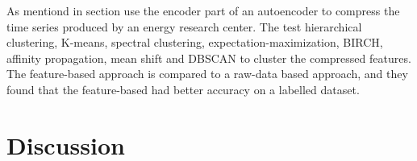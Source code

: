 As mentiond in section \textcite{auto_encoder_many_tsc_algorithms} use the encoder part of an autoencoder to compress the time series produced by an energy research center. 
The test hierarchical clustering, K-means, spectral clustering, expectation-maximization, BIRCH, affinity propagation, mean shift and DBSCAN to cluster the compressed features. 
The feature-based approach is compared to a raw-data based approach, and they found that the feature-based had better accuracy on a labelled dataset.

\section{Discussion}
